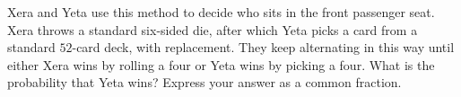 Xera and Yeta use this method to decide who sits in the front passenger seat. Xera throws a standard six-sided die, after which Yeta picks a card from a standard $52$-card deck, with replacement. They keep alternating in this way until either Xera wins by rolling a four or Yeta wins by picking a four. What is the probability that Yeta wins? Express your answer as a common fraction.
